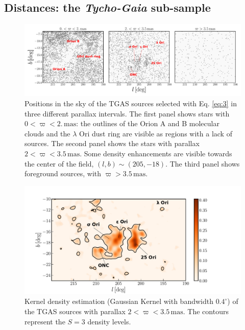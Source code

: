 \documentclass[twocolumn]{aa}
\begin{document}
\subsection{Distances: the \textit{Tycho-Gaia} sub-sample}\label{sec:3.1}
\begin{figure}
\includegraphics[width = \textwidth, keepaspectratio]{fig3_labels.pdf}
\caption{Positions in the sky of the TGAS sources selected with Eq. \eqref{eq:3} in three different parallax intervals.
The first panel shows stars with  $0 < \varpi < 2. \, \mathrm{mas}$: the outlines of the Orion A and B molecular clouds and the $\lambda$ Ori dust ring are visible as regions with a lack of sources. The second panel shows the stars with parallax $ 2 < \varpi <3.5 \, \mathrm{mas}$. Some density enhancements are visible towards the center of the field, $(l, b) \sim (205, -18)$. The third panel shows foreground sources, with $\varpi > 3.5 \, \mathrm{mas}$.
} 
\label{fig:3}
\end{figure}
\begin{figure}
\includegraphics[width = \hsize, keepaspectratio]{fig4_small+labels.pdf}
\caption{Kernel density estimation (Gaussian Kernel with bandwidth $0.4^{\circ}$) of the TGAS sources with parallax $2 < \varpi < 3.5 \, \mathrm{mas}$.  The contours represent the $S = 3$ density levels.}
\label{fig:4}
\end{figure}
\end{document}

